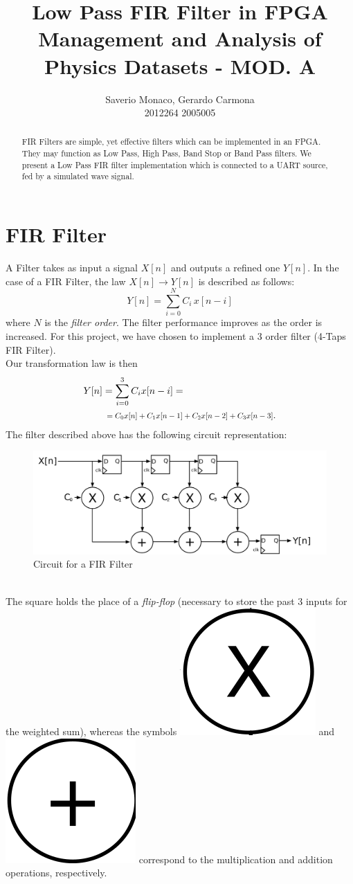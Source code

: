 \documentclass[11pt,a4paper,twocolumn]{IEEEtran}
\author{Saverio Monaco, Gerardo Carmona\\ 2012264\hspace{1.5cm} 2005005\\ \sepline}
\title{\textbf{Low Pass FIR Filter in FPGA}\\ Management and Analysis of Physics Datasets - MOD. A}
\newcommand*{\Scale}[2][4]{\scalebox{#1}{$#2$}}
\begin{document}
	\maketitle
	\begin{abstract}
		FIR Filters are simple, yet effective filters which can be implemented in an FPGA. They may function as Low Pass, High Pass, Band Stop or Band Pass filters. We present a Low Pass FIR filter implementation which is connected to a UART source, fed by a simulated wave signal.
	\end{abstract}
	\section{FIR Filter}
	A Filter takes as input a signal $X[n]$ and outputs a refined one $Y[n]$. In the case of a FIR Filter, the law $X[n]\to Y[n]$ is described as follows: 
	$$ Y[n] = \sum_{i=0}^N C_i\, x[n-i] $$
	where $N$ is the \textit{filter order}. The filter performance improves as the order is increased. For this project, we have chosen to implement a 3 order filter (4-Taps FIR Filter).\\ Our transformation law is then
	$$\begin{aligned} Y[n]&=\sum_{i=0}^3 C_ix[n-i]=\\ & \Scale[0.8]{\hspace*{.2cm}=C_0x[n]+C_1x[n-1]+C_2x[n-2]+C_3x[n-3]}.\end{aligned}$$
	The filter described above has the following circuit representation:
	\begin{figure}[h]
		\centering
		\includegraphics[width=1\linewidth]{img/FIR_direct_svg}
		\caption{Circuit for a FIR Filter}
	\end{figure}\\
	The square holds the place of a \emph{flip-flop} (necessary to store the past 3 inputs for the weighted sum), whereas the symbols \includegraphics[width=0.05\linewidth]{img/x} and \includegraphics[width=0.05\linewidth]{img/+} correspond to the multiplication and addition operations, respectively.
\end{document}
